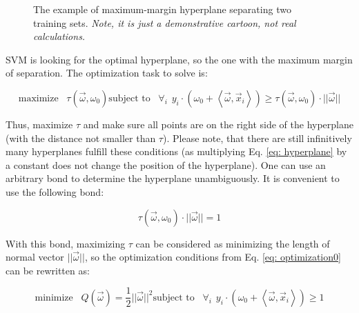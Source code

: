 \begin{figure}
 \centering
 \caption{The example of maximum-margin hyperplane separating two training sets. {\it Note, it is just a demonstrative cartoon, not real calculations.}}
 \label{fig: svmMargin}
\end{figure}

SVM is looking for the optimal hyperplane, so the one with the maximum margin of separation. The optimization task to solve is:

\begin{subequations}
 \begin{equation}
  \text{maximize}\hspace{10pt}\tau (\vec\omega, \omega_0)
 \end{equation}
 \begin{equation}
  \text{subject to}\hspace{10pt}\forall_i\hspace{5pt} y_i \cdot \left(\omega_0 + \left<\vec\omega, \vec x_i\right>\right) \geq \tau(\vec\omega, \omega_0)\cdot ||\vec\omega||
  \label{eq: optimization0C}
 \end{equation}
 \label{eq: optimization0}
\end{subequations}

Thus, maximize $\tau$ and make sure all points are on the right side of the hyperplane (with the distance not smaller than $\tau$). Please note, that there are still infinitively many hyperplanes fulfill these conditions (as multiplying Eq. \ref{eq: hyperplane} by a constant does not change the position of the hyperplane). One can use an arbitrary bond to determine the hyperplane unambiguously. It is convenient to use the following bond:

\begin{equation}
 \tau(\vec\omega, \omega_0)\cdot ||\vec\omega|| = 1
\end{equation}

With this bond, maximizing $\tau$ can be considered as minimizing the length of normal vector $||\vec\omega||$, so the optimization conditions from Eq. \ref{eq: optimization0} can be rewritten as:

\begin{subequations}
 \begin{equation}
  \text{minimize}\hspace{10pt} Q(\vec\omega) = \frac{1}{2}||\vec\omega||^2
  \label{eq: maximize}
 \end{equation}
 \begin{equation}
  \text{subject to}\hspace{10pt}\forall_i\hspace{5pt} y_i \cdot \left(\omega_0 + \left<\vec\omega, \vec x_i\right>\right) \geq 1
  \label{eq: condition}
 \end{equation}
 \label{eq: optimization}
\end{subequations}

